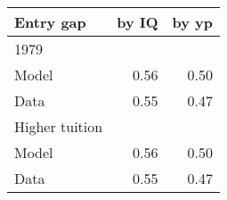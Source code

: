 \begin{tabular}{lrr}
\hline
Entry gap & by IQ  & by yp  \\ 
\hline
1979 &   &   \\ 
Model & 0.56  & 0.50  \\ 
Data & 0.55  & 0.47  \\ 
Higher tuition &   &   \\ 
Model & 0.56  & 0.50  \\ 
Data & 0.55  & 0.47  \\ 
\hline
\end{tabular}%
